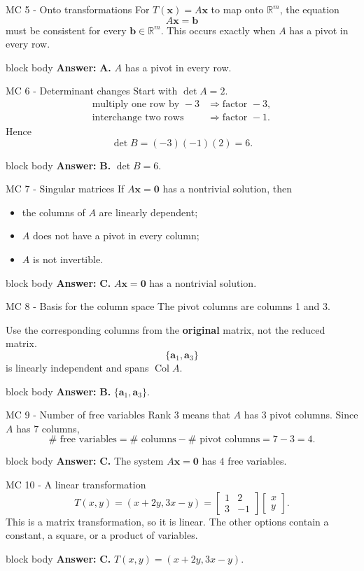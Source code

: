 \documentclass[aspectratio=169]{beamer}
\newcommand{\R}{\mathbb{R}}
\newcommand{\vect}[1]{\mathbf{#1}}
\newcommand{\Col}{\operatorname{Col}}
\newcommand{\answerbox}[1]{%
  \begin{beamercolorbox}[sep=1.0ex,wd=\linewidth]{block body}
    \textbf{Answer:} #1
  \end{beamercolorbox}}
\begin{document}
\begin{frame}{MC 5 - Onto transformations}
For $T(\vect x)=A\vect x$ to map onto $\R^m$, the equation
\[
A\vect x=\vect b
\]
must be consistent for every $\vect b\in\R^m$.
This occurs exactly when $A$ has a pivot in every row.
\answerbox{\textbf{A.} $A$ has a pivot in every row.}
\end{frame}

\begin{frame}{MC 6 - Determinant changes}
Start with $\det A=2$.
\begin{align*}
\text{multiply one row by }-3 &\Longrightarrow \text{factor }-3,\\
\text{interchange two rows} &\Longrightarrow \text{factor }-1.
\end{align*}
Hence
\[
\det B=(-3)(-1)(2)=6.
\]
\answerbox{\textbf{B.} $\det B=6$.}
\end{frame}

\begin{frame}{MC 7 - Singular matrices}
If $A\vect x=\vect0$ has a nontrivial solution, then
\begin{itemize}
  \item the columns of $A$ are linearly dependent;
  \item $A$ does not have a pivot in every column;
  \item $A$ is not invertible.
\end{itemize}
\answerbox{\textbf{C.} $A\vect x=\vect0$ has a nontrivial solution.}
\end{frame}

\begin{frame}{MC 8 - Basis for the column space}
The pivot columns are columns 1 and 3.
\medskip

Use the corresponding columns from the \textbf{original} matrix, not the reduced matrix.
\[
\{\vect a_1,\vect a_3\}
\]
is linearly independent and spans $\Col A$.
\answerbox{\textbf{B.} $\{\vect a_1,\vect a_3\}$.}
\end{frame}

\begin{frame}{MC 9 - Number of free variables}
Rank $3$ means that $A$ has $3$ pivot columns. Since $A$ has $7$ columns,
\[
\#\text{ free variables}
=\#\text{ columns}-\#\text{ pivot columns}
=7-3=4.
\]
\answerbox{\textbf{C.} The system $A\vect x=\vect0$ has $4$ free variables.}
\end{frame}

\begin{frame}{MC 10 - A linear transformation}
\[
T(x,y)=(x+2y,3x-y)
=
\begin{bmatrix}
1&2\\3&-1
\end{bmatrix}
\begin{bmatrix}x\\y\end{bmatrix}.
\]
This is a matrix transformation, so it is linear. The other options contain a constant, a square, or a product of variables.
\answerbox{\textbf{C.} $T(x,y)=(x+2y,3x-y)$.}
\end{frame}
\end{document}
